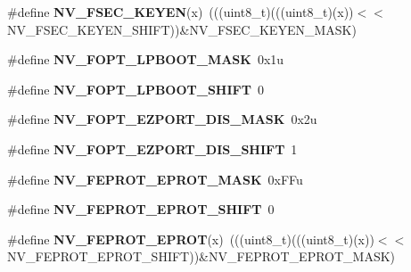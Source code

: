 \begin{DoxyCompactItemize}
\item 
\#define {\bfseries N\+V\+\_\+\+F\+S\+E\+C\+\_\+\+K\+E\+Y\+EN}(x)~(((uint8\+\_\+t)(((uint8\+\_\+t)(x))$<$$<$N\+V\+\_\+\+F\+S\+E\+C\+\_\+\+K\+E\+Y\+E\+N\+\_\+\+S\+H\+I\+FT))\&N\+V\+\_\+\+F\+S\+E\+C\+\_\+\+K\+E\+Y\+E\+N\+\_\+\+M\+A\+SK)\hypertarget{group__NV__Register__Masks_gaca6379e60e0371d1d0c8493abe9db870}{}\label{group__NV__Register__Masks_gaca6379e60e0371d1d0c8493abe9db870}

\item 
\#define {\bfseries N\+V\+\_\+\+F\+O\+P\+T\+\_\+\+L\+P\+B\+O\+O\+T\+\_\+\+M\+A\+SK}~0x1u\hypertarget{group__NV__Register__Masks_gabe7cb388b4a9f41cc264e7df5ecdf883}{}\label{group__NV__Register__Masks_gabe7cb388b4a9f41cc264e7df5ecdf883}

\item 
\#define {\bfseries N\+V\+\_\+\+F\+O\+P\+T\+\_\+\+L\+P\+B\+O\+O\+T\+\_\+\+S\+H\+I\+FT}~0\hypertarget{group__NV__Register__Masks_ga2fc27fe10cf14eb30613e131fe7e758e}{}\label{group__NV__Register__Masks_ga2fc27fe10cf14eb30613e131fe7e758e}

\item 
\#define {\bfseries N\+V\+\_\+\+F\+O\+P\+T\+\_\+\+E\+Z\+P\+O\+R\+T\+\_\+\+D\+I\+S\+\_\+\+M\+A\+SK}~0x2u\hypertarget{group__NV__Register__Masks_ga5c130a6f11de9f04a77b36fd61843e8f}{}\label{group__NV__Register__Masks_ga5c130a6f11de9f04a77b36fd61843e8f}

\item 
\#define {\bfseries N\+V\+\_\+\+F\+O\+P\+T\+\_\+\+E\+Z\+P\+O\+R\+T\+\_\+\+D\+I\+S\+\_\+\+S\+H\+I\+FT}~1\hypertarget{group__NV__Register__Masks_gabf1111ccacc4104b2855c4f3851cbaa5}{}\label{group__NV__Register__Masks_gabf1111ccacc4104b2855c4f3851cbaa5}

\item 
\#define {\bfseries N\+V\+\_\+\+F\+E\+P\+R\+O\+T\+\_\+\+E\+P\+R\+O\+T\+\_\+\+M\+A\+SK}~0x\+F\+Fu\hypertarget{group__NV__Register__Masks_gae309f9fbc7ce46321fbe34e89077fd7a}{}\label{group__NV__Register__Masks_gae309f9fbc7ce46321fbe34e89077fd7a}

\item 
\#define {\bfseries N\+V\+\_\+\+F\+E\+P\+R\+O\+T\+\_\+\+E\+P\+R\+O\+T\+\_\+\+S\+H\+I\+FT}~0\hypertarget{group__NV__Register__Masks_gad725c7b093dfd814cfae3e3fe8522ed2}{}\label{group__NV__Register__Masks_gad725c7b093dfd814cfae3e3fe8522ed2}

\item 
\#define {\bfseries N\+V\+\_\+\+F\+E\+P\+R\+O\+T\+\_\+\+E\+P\+R\+OT}(x)~(((uint8\+\_\+t)(((uint8\+\_\+t)(x))$<$$<$N\+V\+\_\+\+F\+E\+P\+R\+O\+T\+\_\+\+E\+P\+R\+O\+T\+\_\+\+S\+H\+I\+FT))\&N\+V\+\_\+\+F\+E\+P\+R\+O\+T\+\_\+\+E\+P\+R\+O\+T\+\_\+\+M\+A\+SK)\hypertarget{group__NV__Register__Masks_gaa20e7b6ed6390623af67d4ef85a3faf7}{}\label{group__NV__Register__Masks_gaa20e7b6ed6390623af67d4ef85a3faf7}


\end{DoxyCompactItemize}
